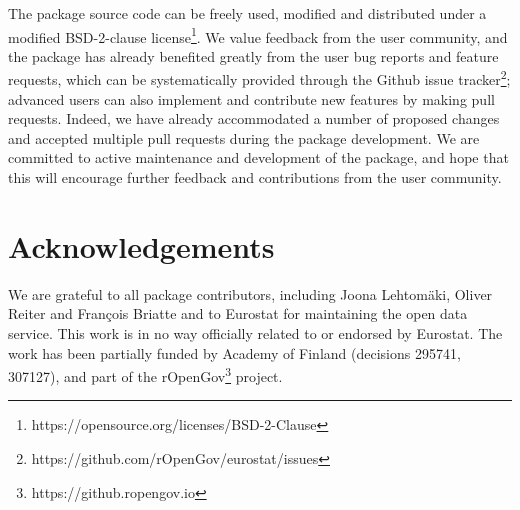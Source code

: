 The package source code can be freely used, modified and distributed under a modified BSD-2-clause license\footnote{https://opensource.org/licenses/BSD-2-Clause}. We value feedback from the user community, and the package has already benefited greatly from the user bug reports and feature requests, which can be systematically provided through the Github issue tracker\footnote{https://github.com/rOpenGov/eurostat/issues}; advanced users can also implement and contribute new features by making pull requests. Indeed, we have already accommodated a number of proposed changes and accepted multiple pull requests during the package development. We are committed to active maintenance and development of the package, and hope that this will encourage further feedback and contributions from the user community.


\section*{Acknowledgements}

We are grateful to all package contributors, including Joona
Lehtom{\"a}ki, Oliver Reiter and Fran\c{c}ois Briatte and to Eurostat
for maintaining the open data service. This work is in no way
officially related to or endorsed by Eurostat. The work has been
partially funded by Academy of Finland (decisions 295741, 307127), and
part of the rOpenGov\footnote{https://github.ropengov.io} project.




\address{Leo Lahti\\
  Department of Mathematics and Statistics\\
  PO Box 20014 University of Turku\\
  Finland\\}

\address{Janne Huovari\\
  Pellervo Economic Research PTT\\
  Eerikinkatu 28 A 00180 Helsinki\\
  Finland\\}

\address{Markus Kainu\\
  Research Department, The Social Insurance Institution of Finland\\
  PO Box 450, 00101 Helsinki\\
  Finland\\}

